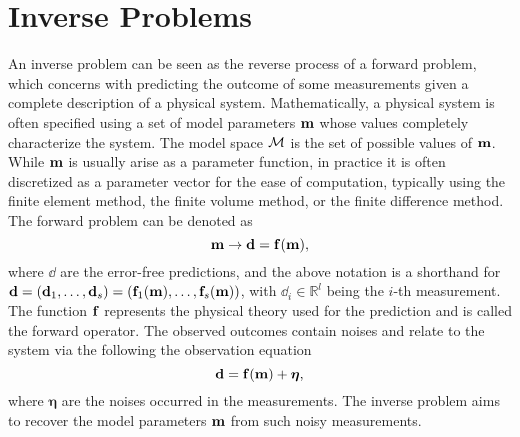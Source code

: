 \section{Inverse Problems}
\label{sec:inv_prob}

An inverse problem can be seen as the reverse process of a forward problem,
which concerns with predicting the outcome of some measurements given a complete
description of a physical system.
Mathematically, a physical system is often specified using a set of model
parameters ${\bf m}$ whose values completely characterize the system.
The model space ${\cal M}$ is the set of possible values of ${\bf m}$.
While ${\bf m}$ is usually arise as a parameter function, in practice it is often
discretized as a parameter vector for the ease of computation, typically using
the finite element method, the finite volume method, or the finite difference
method.
The forward problem can be denoted as 
\begin{equation} \label{eq:forward_prob}
	{\bf m} \to {\bf d} = {\bf f}({\bf m}),
\end{equation}
where $\dd$ are the error-free predictions, and the above notation is a
shorthand for 
${\bf d} 
= ({\bf d}_1, \ldots, {\bf d}_s) 
= ({\bf f}_1({\bf m}), \ldots, {\bf f}_s({\bf m}))$,
with $\dd_{i} \in \mathbb{R}^{l}$ being the $i$-th measurement.
The function ${\bf f}$ represents the physical theory used for the prediction and is
called the forward operator.
The observed outcomes contain noises and relate to the system via the following
the observation equation
\begin{equation} \label{eq:obs}
	{\bf d} = {\bf f}({\bf m}) + \bm{\eta},
\end{equation}
where $\bm{\eta}$ are the noises occurred in the measurements.
The inverse problem aims to recover the model parameters ${\bf m}$ from such noisy
measurements.

